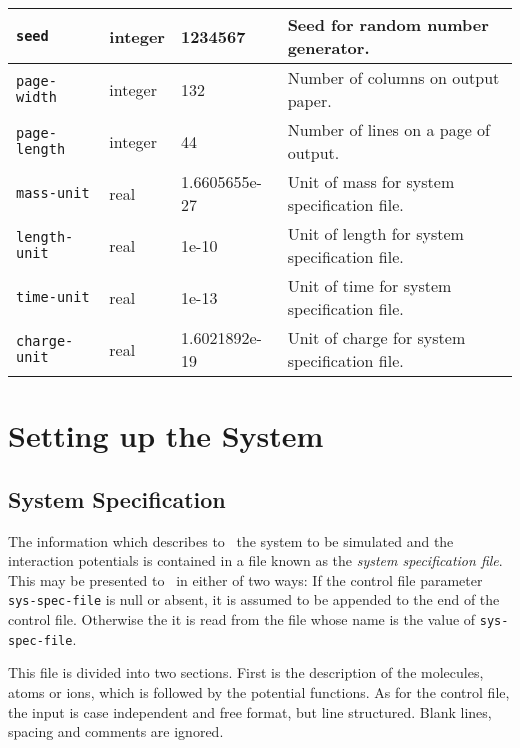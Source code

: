 \begin{table}
\begin{minipage}{\textwidth}
\begin{tabular}{|l|l|l|p{2.7in}|}
\verb'seed' &			integer & 		1234567 &
Seed for random number generator. \\ \hline
\verb'page-width' &	    	integer & 		132 & 
Number of columns on output paper. \\
\verb'page-length' &   	integer & 		44 &
Number of lines on a page of output. \\ \hline
\verb'mass-unit' &	    	real &			1.6605655e-27 &
Unit of mass for system specification file. \\
\verb'length-unit' &    	real &			1e-10 &
Unit of length for system specification file. \\
\verb'time-unit' &		real &			1e-13 &
Unit of time for system specification file. \\
\verb'charge-unit' &		real &			1.6021892e-19 &
Unit of charge for system specification file. \\ \hline
\end{tabular}
\end{minipage}
\end{table}

\section{Setting up the System}
\subsection{System Specification}
\label{sec:sys-spec}

The information which describes to \moldy\  the system to be simulated
and the interaction potentials is contained in a file known as the
{\em system specification file}.  This may be presented to \moldy\  in
either of two ways: If the control file parameter \verb'sys-spec-file'
is null or absent, it is assumed to be appended to the end of the
control file.  Otherwise the it is read from the file whose name is
the value of \verb'sys-spec-file'.

This file is divided into two sections.  First is the description of
the molecules, atoms or ions, which is followed by the potential
functions.  As for the control file, the input is case independent and
free format, but line structured. Blank lines, spacing and comments
are ignored.

